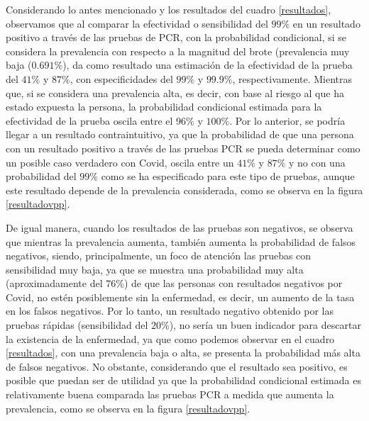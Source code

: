 \documentclass{article}
\begin{document}
Considerando lo antes mencionado y los resultados del cuadro \ref{resultados}, observamos que al comparar la efectividad o sensibilidad del $99\%$ en un resultado positivo a través de las pruebas de PCR, con la probabilidad condicional, si se considera la prevalencia con respecto a la magnitud del brote (prevalencia muy baja ($0.691\%$), da como resultado una estimación de la efectividad de la prueba del $41\%$ y $87\%$, con especificidades del $99\%$ y $99.9\%$, respectivamente. Mientras que, si se considera una prevalencia alta, es decir, con base al riesgo al que ha estado expuesta la persona, la probabilidad condicional estimada para la efectividad de la prueba oscila entre el $96\%$ y $100\%$. Por lo anterior, se podría llegar a un resultado contraintuitivo, ya que la probabilidad de que una persona con un resultado positivo a través de las pruebas PCR se pueda determinar como un posible caso verdadero con Covid, oscila entre un $41\%$ y $87\%$ y no con una probabilidad del $99\%$ como se ha especificado para este tipo de pruebas, aunque este resultado depende de la prevalencia considerada, como se observa en la figura \ref{resultadovpp}.

De igual manera, cuando los resultados de las pruebas son negativos, se observa que mientras la prevalencia aumenta, también aumenta la probabilidad de falsos negativos, siendo, principalmente, un foco de atención las pruebas con sensibilidad muy baja, ya que se muestra una probabilidad muy alta (aproximadamente del $76\%$) de que las personas con resultados negativos por Covid, no estén posiblemente sin la enfermedad, es decir, un aumento de la tasa en los falsos negativos. Por lo tanto, un resultado negativo obtenido por las pruebas rápidas (sensibilidad del $20\%$), no sería un buen indicador para descartar la existencia de la enfermedad, ya que como podemos observar en el cuadro \ref{resultados}, con una prevalencia baja o alta, se presenta la probabilidad más alta de falsos negativos. No obstante, considerando que el resultado sea positivo, es posible que puedan ser de utilidad ya que la probabilidad condicional estimada es relativamente buena comparada las pruebas PCR a medida que aumenta la prevalencia, como se observa en la figura \ref{resultadovpp}.
\end{document}
